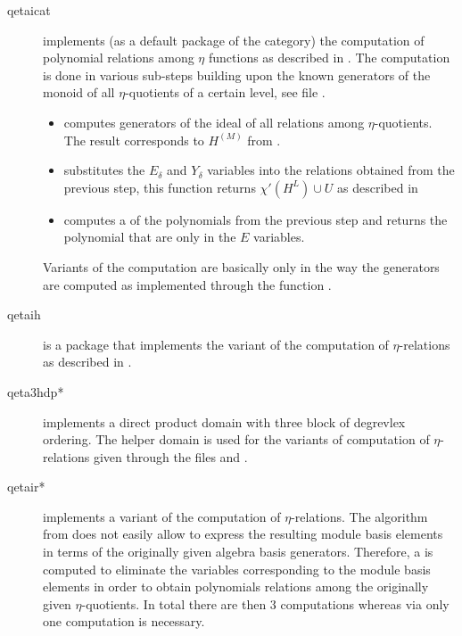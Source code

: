 \documentclass{article}
\begin{document}
\begin{description}
\item[qetaicat] implements (as a default package of the category) the
  computation of polynomial relations among $\eta$ functions as
  described in \cite{Hemmecke+Radu:EtaRelations:2018}. The computation
  is done in various sub-steps building upon the known generators of
  the monoid of all $\eta$-quotients of a certain level, see file
  .
  \begin{itemize}
  \item {} computes generators of the
    ideal of all relations among $\eta$-quotients. The result
    corresponds to $H^{(M)}$ from
    \cite[Chapter~7]{Hemmecke+Radu:EtaRelations:2018}.
  \item {} substitutes the $E_\delta$
    and $Y_\delta$ variables into the relations obtained from the
    previous step, this function returns $\chi'(H^L)\cup U$ as
    described in \cite[Chapter~7]{Hemmecke+Radu:EtaRelations:2018}
  \item {} computes a \GB{} of the polynomials from
    the previous step and returns the polynomial that are only in the
    $E$ variables.
  \end{itemize}
  Variants of the computation are basically only in the way the
  generators are computed as implemented through the function
  .

\item[qetaih] is a package that implements the variant of the
  computation of $\eta$-relations as described in
  \cite{Hemmecke+Radu:EtaRelations:2018}.

\item[qeta3hdp*] implements a direct product domain with three block
  of degrevlex ordering. The helper domain
   is used for the variants of
  computation of $\eta$-relations given through the files
   and .

\item[qetair*] implements a variant of the computation of
  $\eta$-relations. The algorithm  from
  \cite{Radu:RamanujanKolberg:2015} does not easily allow to express
  the resulting module basis elements in terms of the originally given
  algebra basis generators. Therefore, a \GB{} is computed to
  eliminate the variables corresponding to the module basis elements
  in order to obtain polynomials relations among the originally given
  $\eta$-quotients. In total there are then 3 \GB{} computations
  whereas via  only one \GB{} computation is
  necessary.


\end{description}
\end{document}
